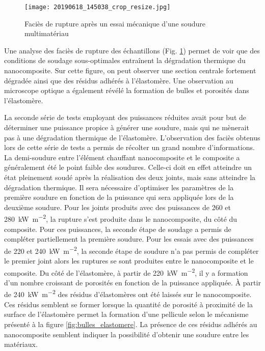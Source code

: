 \begin{figure}[h]
	\centering
	\texttt{[image: 20190618\_145038\_crop\_resize.jpg]}
	\caption{Faciès de rupture après un essai mécanique d'une soudure multimatériau}
	\label{fig:facies_multi_materiau}
\end{figure}

Une analyse des faciès de rupture des échantillons (Fig. \ref{fig:facies_multi_materiau}) permet de voir que des conditions de soudage sous-optimales entraînent la dégradation thermique du nanocomposite. 
Sur cette figure, on peut observer une section centrale fortement dégradée ainsi que des résidus adhérés à l'élastomère. 
Une observation au microscope optique a également révélé la formation de bulles et porosités dans l'élastomère. 

La seconde série de tests employant des puissances réduites avait pour but de déterminer une puissance propice à générer une soudure, mais qui ne mènerait pas à une dégradation thermique de l'élastomère. 
L'observation des faciès obtenus lors de cette série de tests a permis de récolter un grand nombre d'informations. 
La demi-soudure entre l'élément chauffant nanocomposite et le composite a généralement été le point faible des soudures. 
Celle-ci doit en effet atteindre un état pleinement soudé après la réalisation des deux joints, mais sans atteindre la dégradation thermique. 
Il sera nécessaire d'optimiser les paramètres de la première soudure en fonction de la puissance qui sera appliquée lors de la deuxième soudure. 
Pour les joints produits avec des puissances de 260 et \SI[locale=FR]{280}{\kilo\watt\per\square\metre}, la rupture s'est produite dans le nanocomposite, du côté du composite. 
Pour ces puissances, la seconde étape de soudage a permis de compléter partiellement la première soudure. 
Pour les essais avec des puissances de 220 et \SI[locale=FR]{240}{\kilo\watt\per\square\metre}, la seconde étape de soudure n'a pas permis de compléter le premier joint alors les ruptures se sont produites entre le nanocomposite et le composite. 
Du côté de l'élastomère, à partir de \SI[locale=FR]{220}{\kilo\watt\per\square\metre}, il y a formation d'un nombre croissant de porosités en fonction de la puissance appliquée. 
À partir de \SI[locale=FR]{240}{\kilo\watt\per\square\metre} des résidus d'élastomères ont été laissés sur le nanocomposite. 
Ces résidus semblent se former lorsque la quantité de porosité à proximité de la surface de l'élastomère permet la formation d'une pellicule selon le mécanisme présenté à la figure \ref{fig:bulles_elastomere}. 
La présence de ces résidus adhérés au nanocomposite semblent indiquer la possibilité d'obtenir une soudure entre les matériaux. 

